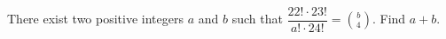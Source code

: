 There exist two positive integers $a$ and $b$ such that $\dfrac{22!\cdot23!}{a!\cdot 24!}=\binom{b}{4}$. Find $a+b$.
